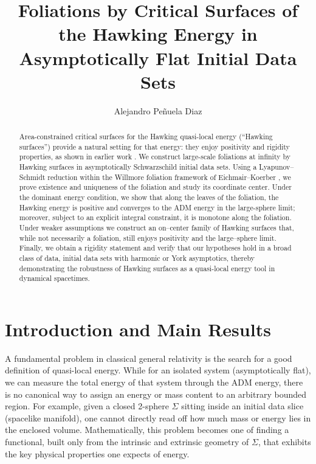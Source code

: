 \documentclass[12pt,a4paper]{amsart}
\title[]{Foliations by Critical Surfaces of the Hawking Energy in Asymptotically Flat Initial Data Sets}
\author[Pe\~nuela Diaz]{Alejandro Pe\~nuela Diaz}
\theoremstyle{plain}
\theoremstyle{definition}
\begin{document}
\begin{abstract}
Area-constrained critical surfaces for the Hawking quasi-local energy (“Hawking surfaces”) provide a natural setting for that energy: they enjoy positivity and rigidity properties, as shown in earlier work \cite{rigidiaz}. We construct large-scale foliations at infinity by Hawking surfaces in asymptotically Schwarzschild initial data sets. Using a Lyapunov–Schmidt reduction within the Willmore foliation framework of Eichmair–Koerber \cite{eichko}, we prove existence and uniqueness of the foliation and study its coordinate center. Under the dominant energy condition, we show that along the leaves of the foliation, the Hawking energy is positive and converges to the ADM energy in the large-sphere limit; moreover, subject to an explicit integral constraint, it is monotone along the foliation. Under weaker assumptions we construct an on–center family of Hawking surfaces that, while not necessarily a foliation, still enjoys positivity and the large–sphere limit. Finally, we obtain a rigidity statement and verify that our hypotheses hold in a broad class of data, initial data sets with harmonic or York asymptotics, thereby demonstrating the robustness of Hawking surfaces as a quasi-local energy tool in dynamical spacetimes. 
\end{abstract}
\maketitle
\section{Introduction and Main Results}


A fundamental problem in classical general relativity is the search for a good definition of quasi-local energy. While for an isolated system (asymptotically flat), we can measure the total energy of that system through the ADM energy, there is no canonical way to assign an energy or mass content to an arbitrary bounded region. For example, given a closed 2-sphere $\Sigma$ sitting inside an initial data slice (spacelike manifold), one cannot directly read off how much mass or energy lies in the enclosed volume. Mathematically, this problem becomes one of finding a functional, built only from the intrinsic and extrinsic geometry of $\Sigma$, that exhibits the key physical properties one expects of energy.
\end{document}
